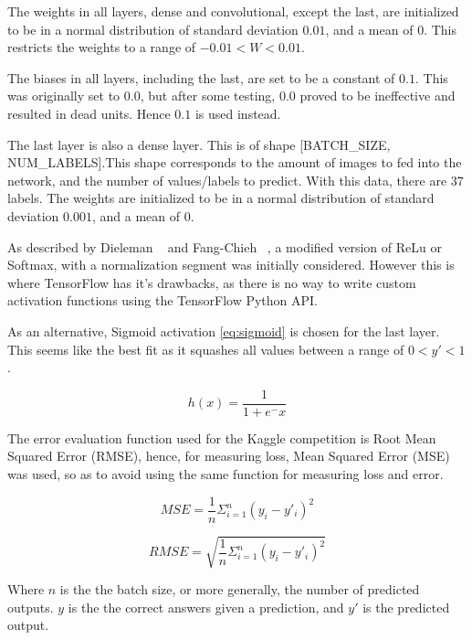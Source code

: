 \documentclass[12pt,a4paper,oneside,oldfontcommands]{memoir}
\begin{document}
The weights in all layers, dense and convolutional, except the last, are initialized to be in a normal distribution of standard deviation \(0.01\), and a mean of \(0\). This restricts the weights to a range of \(-0.01 < W < 0.01\). 

The biases in all layers, including the last, are set to be a constant of \(0.1\). This was originally set to \(0.0\), but after some testing, \(0.0\) proved to be ineffective and resulted in dead units. Hence \(0.1\) is used instead.

The last layer is also a dense layer. This is of shape [BATCH\_SIZE, NUM\_LABELS].This shape corresponds to the amount of images to fed into the network, and the number of values/labels to predict. With this data, there are \(37\) labels.  The weights are initialized to be in a normal distribution of standard deviation \(0.001\), and a mean of \(0\). 

As described by Dieleman ~\cite{Sanders-GZ} and Fang-Chieh ~\cite{Fang}, a modified version of ReLu or Softmax, with a normalization segment was initially considered. However this is where TensorFlow has it's drawbacks, as there is no way to write custom activation functions using the TensorFlow Python API.

As an alternative, Sigmoid activation \ref{eq:sigmoid} is chosen for the last layer. This seems like the best fit as it squashes all values between a range of \(0 < y' < 1\).

\begin{equation}
    h(x) =  \frac{\mathrm{1} }{\mathrm{1} + e^-x }
    \label{eq:sigmoid}
\end{equation}

The error evaluation function used for the Kaggle competition is Root Mean Squared Error (RMSE), hence, for measuring loss, Mean Squared Error (MSE) was used, so as to avoid using the same function for measuring loss and error.

\begin{equation}
     MSE = \frac{1}{n}\Sigma_{i=1}^{n}{({y_i -y'_i})^2}
\end{equation}

\begin{equation}
     RMSE = \sqrt{\frac{1}{n}\Sigma_{i=1}^{n}{({y_i -y'_i})^2}}
\end{equation}

Where \(n\) is the the batch size, or more generally, the number of predicted outputs. \(y\) is the the correct answers given a prediction, and \(y'\) is the predicted output.
\end{document}
